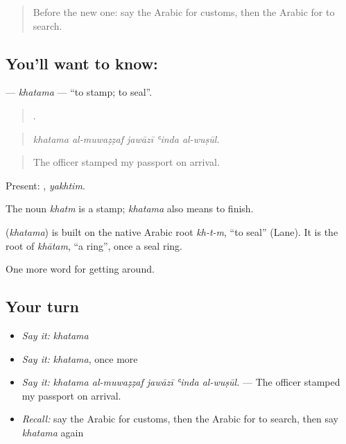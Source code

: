 \label{lesson:AR-C426-khatama}



\begin{quote}
Before the new one: say the Arabic for customs, then the Arabic for to search.
\end{quote}

\subsection*{You'll want to know: }
\textbf{} — \emph{khatama} — \textquotedblleft{}to stamp; to seal\textquotedblright{}.

\begin{quote}
    .
\end{quote}

\begin{quote}
\emph{khatama al-muwaẓẓaf jawāzī ʿinda al-wuṣūl.}
\end{quote}

\begin{quote}
The officer stamped my passport on arrival.
\end{quote}

Present: , \emph{yakhtim}.

The noun \emph{khatm} is a stamp; \emph{khatama} also means to finish.

\begin{cousinweb}
\textbf{} (\emph{khatama}) is built on the native Arabic root \emph{kh-t-m}, \textquotedblleft{}to seal\textquotedblright{} (Lane). It is the root of \emph{khātam}, \textquotedblleft{}a ring\textquotedblright{}, once a seal ring.
\end{cousinweb}

\begin{grammarlens}[title={What you've built}]
One more word for getting around.
\end{grammarlens}

\subsection*{Your turn}
\begin{itemize}
\raggedright
  \item \emph{Say it:} \emph{khatama}
  \item \emph{Say it:} \emph{khatama}, once more
  \item \emph{Say it:} \emph{khatama al-muwaẓẓaf jawāzī ʿinda al-wuṣūl.} — The officer stamped my passport on arrival.
  \item \emph{Recall:} say the Arabic for customs, then the Arabic for to search, then say \emph{khatama} again
\end{itemize}

